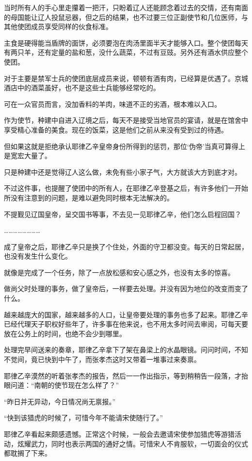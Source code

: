当时所有人的手心里走攥着一把汗，只盼着辽人还能顾念着过去的交情，还有南面的母国能让辽人投鼠忌器，但之后的结果，也不过要三位正副使节和几位医师，与其他使团成员享受同样的伙食标准。

主食是硬得能当盾牌的面饼，必须要泡在肉汤里面半天才能够入口。整个使团每天有两只羊，还有定量的盐和葱，没什么蔬菜，不过有豆豉。另外还有酒水供应整个使团。

对于主要是禁军士兵的使团底层成员来说，顿顿有酒有肉，已经算是优遇了。京城酒店中的酒菜虽好，也不是这些士兵能够经常吃的。

可在一众官员而言，没加香料的羊肉，味道不正的劣酒，根本难以入口。

作为使节，种建中自进入辽境之后，每天不是接受当地官员的宴请，就是在馆舍中享受精心准备的美食。现在的饭菜，这是他们之前从来没有受到过的待遇。

但如果这就是拒绝承认耶律乙辛皇帝身份所得到的惩罚，那位‘伪帝’当真可算得上是宽宏大量了。

只是种建中还是觉得辽人这么做，未免有些小家子气，大方就该大方到底才对。

不过这件事，也提醒了使团中的所有人，在耶律乙辛登基之后，有许多他们一开始所没有注意到的问题，是难以避免同时根本无法解决的。

不提觐见辽国皇帝，呈交国书等事，不去见一见耶律乙辛，他们怎么启程回国？

……………………

成了皇帝之后，耶律乙辛只是换了个住处，外面的守卫都没变。每天的日常起居，也没有发生什么变化。

就像是完成了一个任务，除了一点放松感和安心感之外，也没有太多的惊喜。

做尚父时处理的事务，做了皇帝后，一样要去处理。并没有因为地位的改变而变了什么。

越来越庞大的国家，越来越多的人口，让皇帝要处理的事务也多了起来。耶律乙辛已经代理天子职权好些年了，许多事在他来说，也不用太多时间去审阅，可每天要放在公务上的时间，也绝不会少到哪里。

处理完早间送来的奏章，耶律乙辛拿下了架在鼻梁上的水晶眼镜。问问时间，不知不觉间，竟已快到中午了，而张孝杰这时又带着一堆事过来奏禀。

耶律乙辛漠然的听着张孝杰的报告，然后一一作出指示，等到稍稍告一段落，才抬眼问道：“南朝的使节现在怎么样了？”

“昨日并无异动，今日情况尚无禀报。”

“快到该猎虎的时候了，可惜今年不能请宋使随行了。”

耶律乙辛看起来颇感遗憾。正常这个时候，一般会去邀请宋使参加猎虎等游猎活动，炫耀武力，同时也表示两国的通好之情。可惜宋人不肯服软，一切面会的仪式都耽搁了下来。


